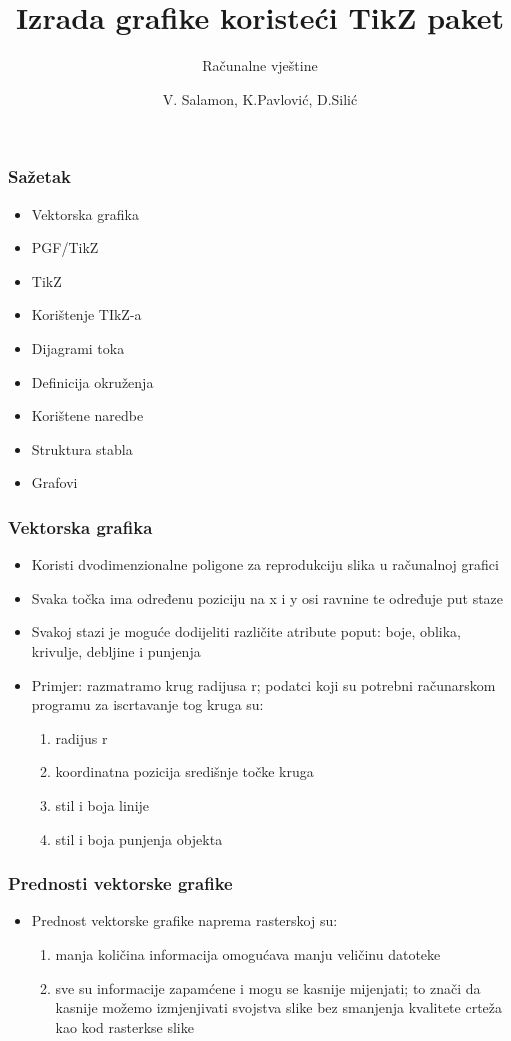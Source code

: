 \documentclass{beamer}
\title[TikZ paket]{Izrada grafike koristeći TikZ paket}
\subtitle{Računalne vještine}
\author{V. Salamon, K.Pavlović, D.Silić}
\date
\begin{document}
	\begin{frame}
	\titlepage
	\end{frame}

	\begin{frame}
	\frametitle{Sažetak}
		\begin{itemize}
			\item Vektorska grafika
			\item PGF/TikZ
			\item TikZ
			\item Korištenje TIkZ-a
			\item Dijagrami toka
			\item Definicija okruženja
			\item Korištene naredbe
			\item Struktura stabla
			\item Grafovi
		\end{itemize}	
	\end{frame}

	\begin{frame}
	\frametitle{Vektorska grafika}
		\begin{itemize}
			\item Koristi dvodimenzionalne poligone za reprodukciju slika u računalnoj grafici
			\item Svaka točka ima određenu poziciju na x i y osi ravnine te određuje put staze
			\item Svakoj stazi je moguće dodijeliti različite atribute poput: boje, oblika, krivulje, debljine i punjenja
			\item Primjer: razmatramo krug radijusa r; podatci koji su potrebni računarskom programu za iscrtavanje tog kruga su:
			\begin{enumerate}
			\item radijus r
			\item koordinatna pozicija središnje točke kruga
			\item stil i boja linije
			\item stil i boja punjenja objekta
			\end{enumerate}	
		\end{itemize}
	\end{frame}

	\begin{frame}
	\frametitle{Prednosti vektorske grafike}
	\begin{itemize}
		\item Prednost vektorske grafike naprema rasterskoj su:
		\begin{enumerate}
		\item manja količina informacija omogućava manju veličinu datoteke
		\item  sve su informacije zapamćene i mogu se kasnije mijenjati; 
    	to znači da kasnije možemo izmjenjivati svojstva slike
    	bez smanjenja kvalitete crteža kao kod rasterkse slike
		\end{enumerate}	
		\end{itemize}
	\end{frame}
\end{document}
